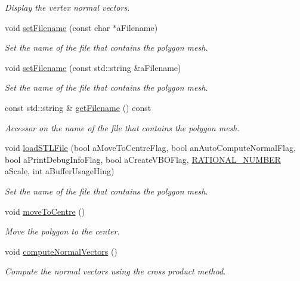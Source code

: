 \begin{DoxyCompactItemize}
\begin{DoxyCompactList}\small\item\em Display the vertex normal vectors. \end{DoxyCompactList}\item 
void \hyperlink{class_graphics_1_1_polygon_mesh_a7af702f04a87789219f5c5373582c7d3}{setFilename} (const char $\ast$aFilename)
\begin{DoxyCompactList}\small\item\em Set the name of the file that contains the polygon mesh. \end{DoxyCompactList}\item 
void \hyperlink{class_graphics_1_1_polygon_mesh_a12051c2f6c3308d729a608cca650ff14}{setFilename} (const std::string \&aFilename)
\begin{DoxyCompactList}\small\item\em Set the name of the file that contains the polygon mesh. \end{DoxyCompactList}\item 
const std::string \& \hyperlink{class_graphics_1_1_polygon_mesh_a2bbcd8e618e1698f79eb7a8996e7a646}{getFilename} () const 
\begin{DoxyCompactList}\small\item\em Accessor on the name of the file that contains the polygon mesh. \end{DoxyCompactList}\item 
void \hyperlink{class_graphics_1_1_polygon_mesh_a3a2d83e615dc381d4cc45e0a5551725a}{loadSTLFile} (bool aMoveToCentreFlag, bool anAutoComputeNormalFlag, bool aPrintDebugInfoFlag, bool aCreateVBOFlag, \hyperlink{namespace_utilities_a40969b96bd8d847b962e297cb79f08ce}{RATIONAL\_\-NUMBER} aScale, int aBufferUsageHing)
\begin{DoxyCompactList}\small\item\em Set the name of the file that contains the polygon mesh. \end{DoxyCompactList}\item 
void \hyperlink{class_graphics_1_1_polygon_mesh_a26f0e68845c9f24896d8156ff72e747a}{moveToCentre} ()
\begin{DoxyCompactList}\small\item\em Move the polygon to the center. \end{DoxyCompactList}\item 
void \hyperlink{class_graphics_1_1_polygon_mesh_ad5841a84e5c7c794010bc87ad65694e0}{computeNormalVectors} ()
\begin{DoxyCompactList}\small\item\em Compute the normal vectors using the cross product method. \end{DoxyCompactList}\item 

\end{DoxyCompactItemize}

